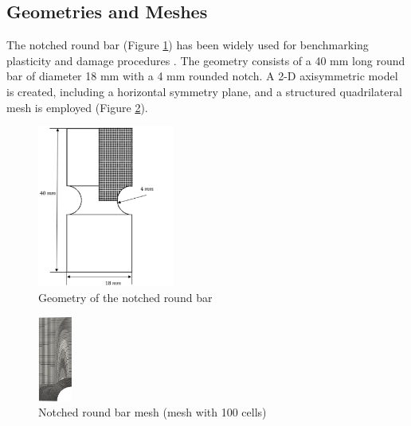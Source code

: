 \documentclass[sn-mathphys,Numbered,draft]{sn-jnl}%
\begin{document}
\subsection{Geometries and Meshes}
The notched round bar (Figure \ref{fig:notched_bar_geom}) has been widely used for benchmarking plasticity and damage procedures \cite{cesar_de_sa_damage_2006, fincato_return_2018, vaz_aspects_2001}.
The geometry consists of a 40 \si{\milli\meter} long round bar of diameter 18 \si{\milli\meter} with a 4 \si{\milli\meter} rounded notch.
A 2-D axisymmetric model is created, including a horizontal symmetry plane, and a structured quadrilateral mesh is employed (Figure \ref{fig:notched_bar_mesh}).

\begin{figure}[htb] \label{fig:notched_bar_geom}
\begin{center}
	\includegraphics[width=0.4\textwidth]{./Figures/finiteVolumeImplementation/inhomogenousDeformation/axiNotchedCase.png}
\caption{Geometry of the notched round bar}
\end{center}
\end{figure}

\begin{figure}[htbp]
	\centering
		\includegraphics[width=0.1\textwidth]{./Figures/finiteVolumeImplementation/inhomogenousDeformation/axiNotchedMeshBW.png}
		
		
		\caption{Notched round bar mesh (mesh with 100 cells)}
	\label{fig:notched_bar_mesh}
\end{figure}
\end{document}
